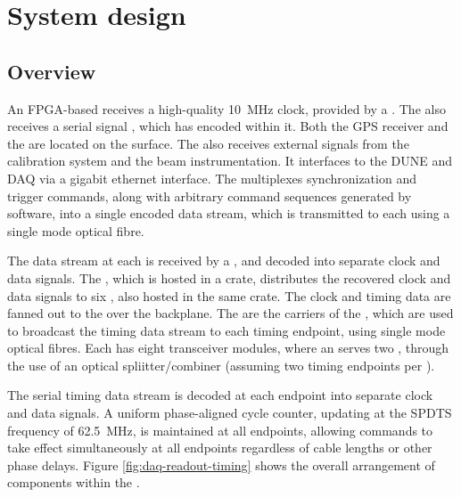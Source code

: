 \documentclass{article}
\begin{document}
\section{System design}
\label{sec:system_design}
\subsection{Overview}
An FPGA-based  receives a high-quality \SI{10}{\MHz} clock, provided by a . The  also receives a serial  signal \cite{irig}, which has  encoded within it. Both the GPS receiver and the  are located on the surface. The  also receives external signals from the calibration system and the beam instrumentation. It interfaces to the DUNE  and DAQ via a gigabit ethernet interface. The  multiplexes synchronization and trigger commands, along with arbitrary command sequences generated by software, into a single encoded data stream, which is transmitted to each  using a single mode optical fibre.

The data stream at each  is received by a , and decoded into separate clock and data signals. The , which is hosted in a  crate, distributes the recovered clock and data signals to six , also hosted in the same crate. The clock and timing data are fanned out to the  over the  backplane. The  are the carriers of the , which are used to broadcast the timing data stream to each timing endpoint, using single mode optical fibres. Each  has eight  transceiver modules, where an  serves two , through the use of an optical spliitter/combiner (assuming two timing endpoints per ).

The serial timing data stream is decoded at each endpoint into separate clock and data signals. A uniform phase-aligned cycle counter, updating at the SPDTS frequency of \SI{62.5}{\MHz}, is maintained at all endpoints, allowing commands to take effect simultaneously at all endpoints regardless of cable lengths or other phase delays. Figure \ref{fig:daq-readout-timing} shows the overall arrangement of components within the .
\end{document}
